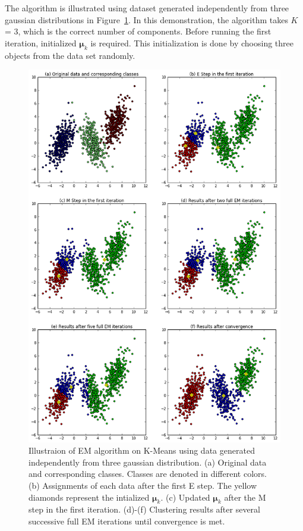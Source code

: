 The algorithm is illustrated using dataset generated independently from three gaussian distributions in Figure~\ref{fig:EM4KMeans}. In this demonstration, the algorithm takes \(K\) = 3, which is the correct number of components. Before running the first iteration, initialized \(\boldsymbol{\mu}_k\) is required. This initialization is done by choosing three objects from the data set randomly.
\begin{figure}[ht]
	\begin{center}
		\includegraphics[width=\textwidth]{images/EM4KMeans.png}
		\caption{Illustraion of EM algorithm on K-Means using data generated independently from three gaussian distribution. (a) Original data and corresponding classes. Classes are denoted in different colors. (b) Assignments of each data after the first E step. The yellow diamonds represent the intialized \(\boldsymbol{\mu}_k\). (c) Updated \(\boldsymbol{\mu}_k\) after the M step in the first iteration. (d)-(f) Clustering results after several successive full EM iterations until convergence is met.}
		\label{fig:EM4KMeans}
	\end{center}
\end{figure}
